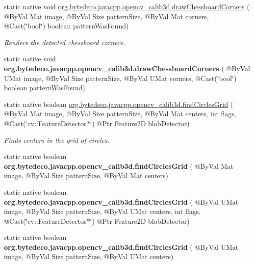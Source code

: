 \begin{DoxyCompactItemize}
\item 
static native void \hyperlink{group__calib3d_ga71d497eb4a9eead84d1e4522d54ed580}{org.\+bytedeco.\+javacpp.\+opencv\+\_\+calib3d.\+draw\+Chessboard\+Corners} ( @By\+Val Mat image, @By\+Val Size pattern\+Size, @By\+Val Mat corners, @Cast(\char`\"{}bool\char`\"{}) boolean pattern\+Was\+Found)
\begin{DoxyCompactList}\small\item\em Renders the detected chessboard corners. \end{DoxyCompactList}\item 
\mbox{\label{group__calib3d_ga821e7c3e29e508aa0ec2a42a7b095a1a}} 
static native void {\bfseries org.\+bytedeco.\+javacpp.\+opencv\+\_\+calib3d.\+draw\+Chessboard\+Corners} ( @By\+Val U\+Mat image, @By\+Val Size pattern\+Size, @By\+Val U\+Mat corners, @Cast(\char`\"{}bool\char`\"{}) boolean pattern\+Was\+Found)
\item 
static native boolean \hyperlink{group__calib3d_ga150470ce16ca1879fd1809729801803b}{org.\+bytedeco.\+javacpp.\+opencv\+\_\+calib3d.\+find\+Circles\+Grid} ( @By\+Val Mat image, @By\+Val Size pattern\+Size, @By\+Val Mat centers, int flags, @Cast(\char`\"{}cv\+::\+Feature\+Detector$\ast$\char`\"{}) @Ptr Feature2D blob\+Detector)
\begin{DoxyCompactList}\small\item\em Finds centers in the grid of circles. \end{DoxyCompactList}\item 
\mbox{\label{group__calib3d_gaff046b0dd179f7144de4a30bc2c49806}} 
static native boolean {\bfseries org.\+bytedeco.\+javacpp.\+opencv\+\_\+calib3d.\+find\+Circles\+Grid} ( @By\+Val Mat image, @By\+Val Size pattern\+Size, @By\+Val Mat centers)
\item 
\mbox{\label{group__calib3d_ga7745c01f702f3e200bd9f7db2152b898}} 
static native boolean {\bfseries org.\+bytedeco.\+javacpp.\+opencv\+\_\+calib3d.\+find\+Circles\+Grid} ( @By\+Val U\+Mat image, @By\+Val Size pattern\+Size, @By\+Val U\+Mat centers, int flags, @Cast(\char`\"{}cv\+::\+Feature\+Detector$\ast$\char`\"{}) @Ptr Feature2D blob\+Detector)
\item 
\mbox{\label{group__calib3d_ga3a90268262be01f1cd5179aa84e38bb3}} 
static native boolean {\bfseries org.\+bytedeco.\+javacpp.\+opencv\+\_\+calib3d.\+find\+Circles\+Grid} ( @By\+Val U\+Mat image, @By\+Val Size pattern\+Size, @By\+Val U\+Mat centers)

\end{DoxyCompactItemize}
